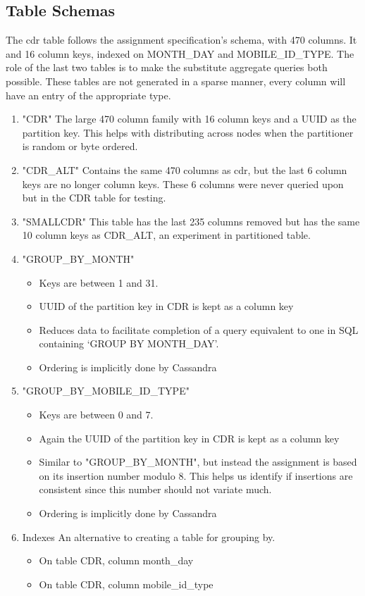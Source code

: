 \documentclass[letterpaper]{article}
\begin{document}
\subsection{Table Schemas}
The cdr table follows the assignment specification's schema, with 470 columns.
It 
and 16 column keys, indexed on MONTH\_DAY and MOBILE\_ID\_TYPE.
The role of the last two tables is to make the substitute
aggregate queries both possible.
These tables are not generated in a sparse manner, every column will have an entry of the appropriate type.
\begin{enumerate}
	\item "CDR"
		The large 470 column family with 16
		column keys and a UUID as the partition key. This helps with distributing across nodes
		when the partitioner is random or byte ordered.

	\item "CDR\_ALT"
		Contains the same 470 columns as cdr, but the last 6 column
		keys are no longer column keys. These 6 columns were never queried upon but in the CDR table
		for testing.
		
	\item "SMALLCDR"
		This table has the last 235 columns removed but has the same 10 column keys as CDR\_ALT,
		an experiment in partitioned table.

	\item "GROUP\_BY\_MONTH" 
		\begin{itemize}
			\item Keys are between 1 and 31.
			\item UUID of the partition key in CDR is kept as a column key
			\item Reduces data to facilitate completion of
				a query equivalent to one in SQL
				containing `GROUP BY MONTH\_DAY'.
			\item Ordering is implicitly done by Cassandra
		\end{itemize}
	\item "GROUP\_BY\_MOBILE\_ID\_TYPE"
		\begin{itemize}
			\item Keys are between 0 and 7.
			\item Again the UUID of the partition key in CDR is kept as a column key
			\item Similar to "GROUP\_BY\_MONTH", but instead
				the assignment
				is based on its insertion number modulo
				8. This helps us identify if insertions are consistent since 
				this number should not variate much.
				
			\item Ordering is implicitly done by Cassandra
		\end{itemize}
		
	\item Indexes
		 An alternative to creating a table for grouping by.
		\begin{itemize}
			\item On table CDR, column month\_day
			\item On table CDR, column mobile\_id\_type
		\end{itemize}
		
\end{enumerate}
\end{document}
